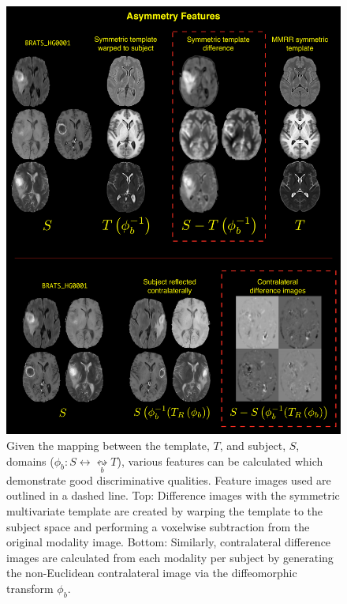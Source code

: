 \documentclass[preprint,authoryear,review,12pt]{elsarticle}
\begin{document}
\begin{figure}
  \centering
    \includegraphics[width=120mm]{asymmetryFeatureImages.pdf}
  \caption{ Given the mapping between the template, $T$, and subject, $S$, domains ($\phi_b: S  \leftrightarrow \underset{b}{\leftrightsquigarrow} T$), various features can be calculated which demonstrate good discriminative qualities.  Feature images used are outlined in a dashed line.
Top:  Difference images with the symmetric multivariate template are created by warping the template to the subject space and performing a voxelwise subtraction from the original modality image.
Bottom:  Similarly, contralateral difference images are calculated from each modality per subject by generating the non-Euclidean contralateral image via the diffeomorphic transform $\phi_b$.  
          }
  \label{fig:asymmetryFeatures}
\end{figure}
\end{document}
